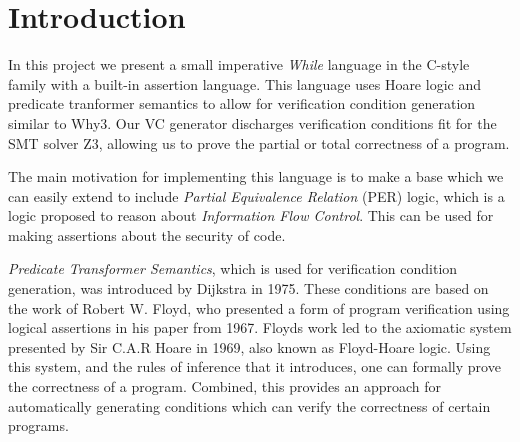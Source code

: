 \section{Introduction}



In this project we present a small imperative \textit{While} language in the C-style family with a built-in assertion language.
This language uses Hoare logic and predicate tranformer semantics to allow for verification condition generation similar to Why3.
Our VC generator discharges verification conditions fit for the SMT solver Z3, allowing us to prove the partial or total correctness of a program.

The main motivation for implementing this language is to make a base which we can easily extend to include \textit{Partial Equivalence Relation} (PER) logic, which is a logic proposed to reason about \textit{Information Flow Control}\cite{Filinski-Jensen-Larsen:Unpublished-IFC}. This can be used for making assertions about the security of code.

\textit{Predicate Transformer Semantics}, which is used for verification condition generation, was introduced by Dijkstra in 1975\cite{Dijkstra}.
These conditions are based on the work of Robert W. Floyd, who presented a form of program verification using logical assertions in his paper from 1967\cite{Floyd1967}. 
Floyds work led to the axiomatic system presented by Sir C.A.R Hoare in 1969\cite{Hoare}, also known as Floyd-Hoare logic. Using this system, and the rules of inference that it introduces, one can formally prove the correctness of a program.
Combined, this provides an approach for automatically generating conditions which can verify the correctness of certain programs.

